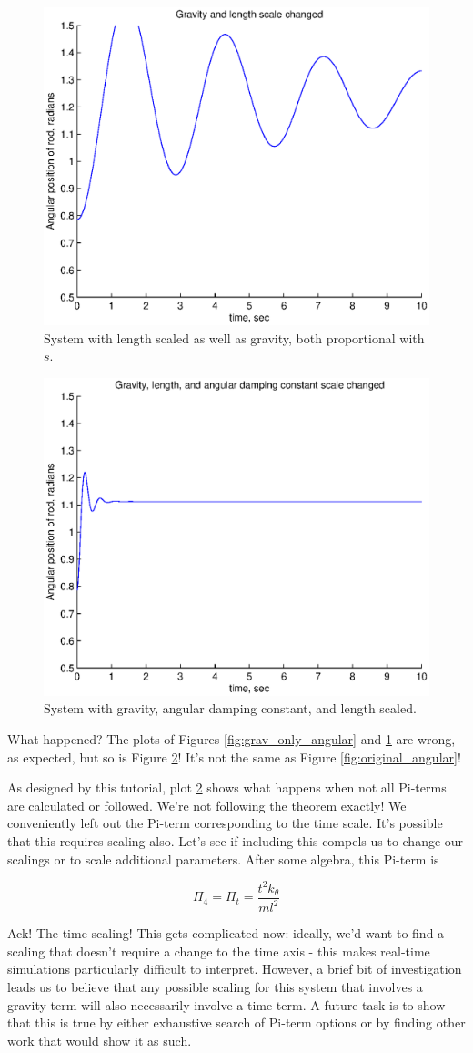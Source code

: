 \documentclass[12pt,letterpaper]{article}
\begin{document}
\begin{figure}[ht]
  \centering
  \includegraphics[width=.48\linewidth]{img/l_g_angular.eps}
  \caption{System with length scaled as well as gravity, both proportional with $s$. }
  \label{fig:l_g_angular}
\end{figure}

\begin{figure}[ht]
  \centering
  \includegraphics[width=.48\linewidth]{img/l_g_c_angular.eps}
  \caption{System with gravity, angular damping constant, and length scaled. }
  \label{fig:l_g_c_angular}
\end{figure}


What happened? The plots of Figures \ref{fig:grav_only_angular} and \ref{fig:l_g_angular} are wrong, as expected, but so is Figure \ref{fig:l_g_c_angular}!
It's not the same as Figure \ref{fig:original_angular}! 


As designed by this tutorial, plot \ref{fig:l_g_c_angular} shows what happens when not all Pi-terms are calculated or followed.
We're not following the theorem exactly! 
We conveniently left out the Pi-term corresponding to the time scale.
It's possible that this requires scaling also. 
Let's see if including this compels us to change our scalings or to scale additional parameters.
After some algebra, this Pi-term is

\[
\Pi_4 = \Pi_{t} = \frac{t^2 k_{\theta}}{m l^2}
\]

Ack! The time scaling! 
This gets complicated now: ideally, we'd want to find a scaling that doesn't require a change to the time axis - this makes real-time simulations particularly difficult to interpret.
However, a brief bit of investigation leads us to believe that any possible scaling for this system that involves a gravity term will also necessarily involve a time term.
A future task is to show that this is true by either exhaustive search of Pi-term options or by finding other work that would show it as such. 
\end{document}
